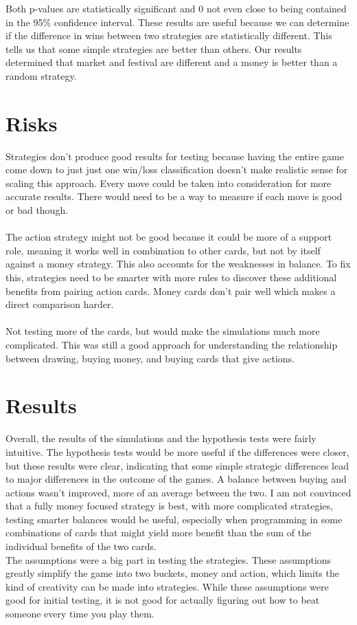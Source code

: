\documentclass[11pt, oneside]{article}   	%
\begin{document}
Both p-values are statistically significant and 0 not even close to being contained in the 95\% confidence interval. These results are useful because we can determine if the difference in wins between two strategies are statistically different. This tells us that some simple strategies are better than others. Our results determined that market and festival are different and a money is better than a random strategy. 

\section{Risks}

Strategies don't produce good results for testing because having the entire game come down to just just one win/loss classification doesn't make realistic sense for scaling this approach. Every move could be taken into consideration for more accurate results. There would need to be a way to measure if each move is good or bad though. 
\\
\\
The action strategy might not be good because it could be more of a support role, meaning it works well in combination to other cards, but not by itself against a money strategy. This also accounts for the weaknesses in balance. To fix this, strategies need to be smarter with more rules to discover these additional benefits from pairing action cards. Money cards don't pair well which makes a direct comparison harder. 
\\
\\
Not testing more of the cards, but would make the simulations much more complicated. This was still a good approach for understanding the relationship between drawing, buying money, and buying cards that give actions.

\section{Results}

Overall, the results of the simulations and the hypothesis tests were fairly intuitive. The hypothesis tests would be more useful if the differences were closer, but these results were clear, indicating that some simple strategic differences lead to major differences in the outcome of the games. A balance between buying and actions wasn't improved, more of an average between the two. I am not convinced that a fully money focused strategy is best, with more complicated strategies, testing smarter balances would be useful, especially when programming in some combinations of cards that might yield more benefit than the sum of the individual benefits of the two cards. 
\\
The assumptions were a big part in testing the strategies. These assumptions greatly simplify the game into two buckets, money and action, which limits the kind of creativity can be made into strategies. While these assumptions were good for initial testing, it is not good for actually figuring out how to beat someone every time you play them. 
\end{document}
